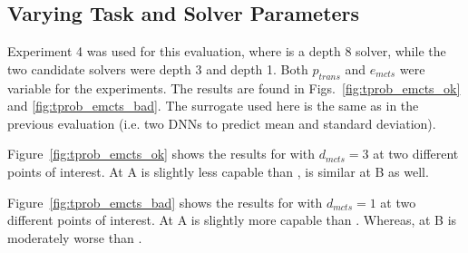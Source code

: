 \subsection{Varying Task and Solver Parameters}
Experiment 4 was used for this evaluation, where \solvestar{} is a depth 8 solver, while the two candidate solvers were depth 3 and depth 1. Both $p_{trans}$ and $e_{mcts}$ were variable for the experiments. The results are found in Figs.~\ref{fig:tprob_emcts_ok} and \ref{fig:tprob_emcts_bad}. The surrogate \surrogate{} used here is the same as in the previous evaluation (i.e. two DNNs to predict mean and standard deviation).

Figure~\ref{fig:tprob_emcts_ok} shows the results for \solve{} with $d_{mcts}=3$ at two different points of interest. At A \solve{} is slightly less capable than \solvestar{}, \xQ{} is similar at B as well.

Figure~\ref{fig:tprob_emcts_bad} shows the results for \solve{} with $d_{mcts}=1$ at two different points of interest. At A \solve{} is slightly more capable than \solvestar{}. Whereas, at B \solve{} is moderately worse than \solvestar{}.

